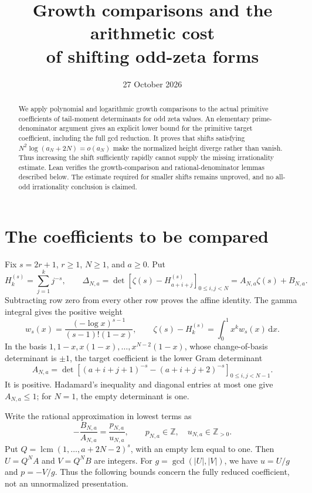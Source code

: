 \documentclass[11pt]{article}
\title{Growth comparisons and the arithmetic cost\\of shifting odd-zeta forms}
\author{}
\date{27 October 2026}
\newcommand{\Z}{\mathbb Z}
\newcommand{\dd}{\,\mathrm{d}}
\begin{document}
\maketitle
\begin{abstract}
We apply polynomial and logarithmic growth comparisons to the actual
primitive coefficients of tail-moment determinants for odd zeta values.
An elementary prime-denominator argument gives an explicit lower bound
for the primitive target coefficient, including the full gcd reduction.
It proves that shifts satisfying
$N^2\log(a_N+2N)=o(a_N)$ make the normalized height diverge rather than
vanish. Thus increasing the shift sufficiently rapidly cannot supply the
missing irrationality estimate. Lean verifies the growth-comparison and
rational-denominator lemmas described below. The estimate required for
smaller shifts remains unproved, and no all-odd irrationality conclusion
is claimed.
\end{abstract}

\section{The coefficients to be compared}
Fix $s=2r+1$, $r\ge1$, $N\ge1$, and $a\ge0$. Put
\[
 H_k^{(s)}=\sum_{j=1}^k j^{-s},\qquad
 \Delta_{N,a}=\det[\zeta(s)-H_{a+i+j}^{(s)}]_{0\le i,j<N}
             =A_{N,a}\zeta(s)+B_{N,a}.
\]
Subtracting row zero from every other row proves the affine identity.
The gamma integral gives the positive weight
\[
 w_s(x)=\frac{(-\log x)^{s-1}}{(s-1)!(1-x)},\qquad
 \zeta(s)-H_k^{(s)}=\int_0^1x^k w_s(x)\dd x .
\]
In the basis $1,1-x,x(1-x),\ldots,x^{N-2}(1-x)$, whose change-of-basis
determinant is $\pm1$, the target coefficient is the lower Gram determinant
\begin{equation}
 A_{N,a}=
 \det[(a+i+j+1)^{-s}-(a+i+j+2)^{-s}]_{0\le i,j<N-1}.
 \label{eq:A}
\end{equation}
It is positive. Hadamard's inequality and diagonal entries at most one
give $A_{N,a}\le1$; for $N=1$, the empty determinant is one.

Write the rational approximation in lowest terms as
\[
 -\frac{B_{N,a}}{A_{N,a}}=\frac{p_{N,a}}{u_{N,a}},\qquad
 p_{N,a}\in\Z,\quad u_{N,a}\in\Z_{>0}.
\]
Put $Q=\operatorname{lcm}(1,\ldots,a+2N-2)^s$, with an empty lcm equal to one.
Then $U=Q^NA$ and $V=Q^NB$ are integers. For
$g=\gcd(|U|,|V|)$, we have $u=U/g$ and $p=-V/g$. Thus the following bounds
concern the fully reduced coefficient, not an unnormalized presentation.
\end{document}
